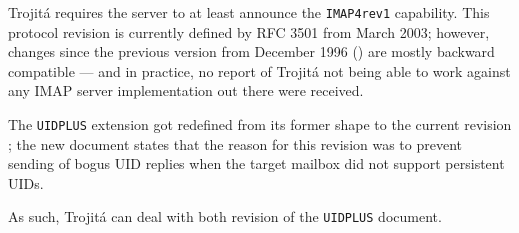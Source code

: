 \documentclass[trojita]{subfiles}
\begin{document}
\begin{trojitabehavior}
Trojitá requires the server to at least announce the {\tt IMAP4rev1} capability.  This protocol revision is currently
defined by RFC 3501 \cite{rfc3501} from March 2003; however, changes since the previous version from December 1996
(\cite{rfc2060}) are mostly backward compatible --- and in practice, no report of Trojitá not being able to work against
any IMAP server implementation out there were received.
\end{trojitabehavior}

The {\tt UIDPLUS} extension got redefined from its former shape \cite{rfc2359} to the current revision \cite{rfc4315};
the new document states that the reason for this revision was to prevent sending of bogus UID replies when the target
mailbox did not support persistent UIDs.

\begin{trojitabehavior}
As such, Trojitá can deal with both revision of the {\tt UIDPLUS} document.
\end{trojitabehavior}
\end{document}
